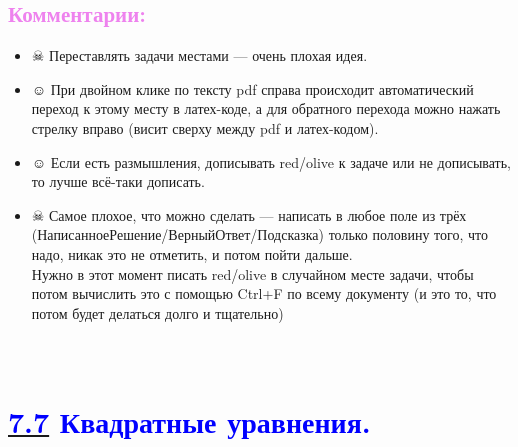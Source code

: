 \documentclass[12pt]{article}
\newcounter{num}
\newenvironment{mylist} %
{ \begin{itemize}
    \setlength{\itemsep}{0pt}
    \setlength{\parskip}{0pt}
    \setlength{\parsep}{0pt}     }
{ \end{itemize}                  }
\begin{document}
\subsection*{\textcolor{Violet}{\textbf{Комментарии:}}}%
\begin{mylist}
\item [$\skull$] Переставлять задачи местами --- очень плохая идея.

\item [$\smiley$] При двойном клике по тексту pdf справа происходит автоматический переход к этому месту в латех-коде, а для обратного перехода можно нажать стрелку вправо (висит сверху между pdf и латех-кодом).

\item [$\smiley$] Если есть размышления, дописывать red/olive к задаче или не дописывать, то лучше всё-таки дописать.

\item [$\skull$] Самое плохое, что можно сделать --- написать в любое поле из трёх (НаписанноеРешение/ВерныйОтвет/Подсказка) только половину того, что надо, никак это не отметить, и потом пойти дальше.\\ Нужно в этот момент писать red/olive в случайном месте задачи, чтобы потом вычислить это с помощью Ctrl+F по всему документу (и это то, что потом будет делаться долго и тщательно)
\end{mylist}

\newpage
\setcounter{num}{675}

\hypertarget{7.7}{{\centering\section*{\bigskip\\\textcolor{Blue}{\hyperlink{start2}{\textcolor{Blue}{7.7}} Квадратные уравнения.}\vspace{-5mm}}}}
\end{document}
